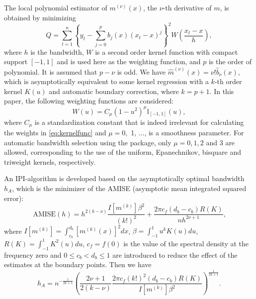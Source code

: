 The local polynomial estimator of $m^{\left(\nu\right)}\left(x\right)$, the $\nu$-th derivative of $m$, is obtained by minimizing 
\begin{equation}\label{eq:LWSformula}
Q = \sum_{t=1}^{n}\left\{y_{t} - \sum_{j=0}^{p}b_{j}\left(x\right)\left(x_{t} - x\right)^{j}\right\}^{2}W\left(\frac{x_{t} - x}{h}\right), 
\end{equation}  
where $h$ is the bandwidth, $W$ is a second order kernel function with compact support $\left[-1, 1\right]$ and is used here as the weighting function, and $p$ is the order of polynomial. It is assumed that $p-\nu$ is odd. We have $\hat m^{\left(\nu\right)}\left(x\right)=\nu!\hat b_\nu\left(x\right)$, which is asymptotically equivalent to some kernel regression with a $k$-th order kernel $K\left(u\right)$ and automatic boundary correction, where $k=p+1$. In this paper, the following weighting functions are considered: 
\begin{equation}\label{eq:kernelfunc}
W\left(u\right) = C_{\mu}\left(1-u^{2}\right)^{\mu}\mathbb{I}_{\left[-1,1\right]}\left(u\right), 
\end{equation}
where $C_{\mu}$ is a standardization constant that is indeed irrelevant for calculating the weights in \eqref{eq:kernelfunc} and $\mu=0,$ 1, ..., is a smoothness parameter. For automatic bandwidth selection using the  package, only $\mu = 0, 1, 2$ and $3$ are allowed, corresponding to the use of the uniform, Epanechnikov, bisquare and triweight kernels, respectively. 

An IPI-algorithm is developed based on the asymptotically optimal bandwidth $h_A$, which is the minimizer of the AMISE (asymptotic mean integrated squared error): 
\begin{equation}\label{eq:AMISE}
\text{AMISE}\left(h\right) = h^{2\left(k-\nu\right)}\frac{I\left[m^{\left(k\right)}\right]\beta^{2}}{\left(k!\right)^{2}} + \frac{2\pi c_{f}\left(d_{b}-c_{b}\right)R\left(K\right)}{nh^{2\nu+1}}\text{,} 
\end{equation}
where $I\left[m^{\left(k\right)}\right] = \int_{c_{b}}^{d_{b}}\left[m^{\left(k\right)}\left(x\right)\right]^{2}dx$, $\beta=\int_{-1}^{1}u^{k}K\left(u\right)du$, $R\left(K\right)=\int_{-1}^{1}K^{2}\left(u\right)du$, $c_{f} = f\left(0\right)$ is the value of the spectral density at the frequency zero and $0\le c_b < d_b\le 1$ are introduced to reduce the effect of the estimates at the boundary points. 
Then we have 
\begin{equation}\label{eq:hOpt}
h_{A}=n^{-\frac{1}{2k+1}}\left(\frac{2\nu + 1}{2\left(k - \nu\right)}\frac{2\pi c_{f}\left(k!\right)^{2}\left(d_{b}-c_{b}\right)R\left(K\right)}{I\left[m^{\left(k\right)}\right]\beta^{2}}\right)^{\frac{1}{2k+1}}. 
\end{equation}

